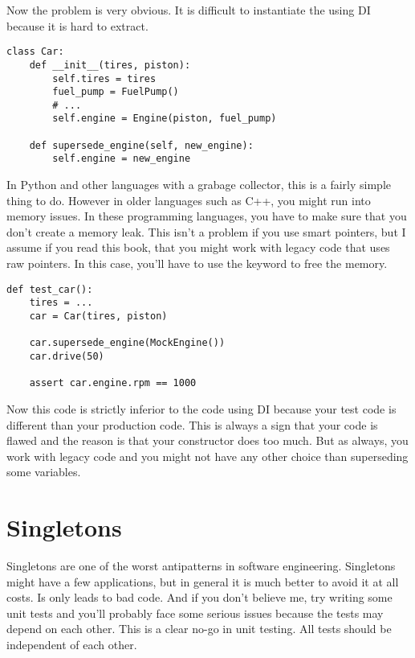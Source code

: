 Now the problem is very obvious. It is difficult to instantiate the  using DI because it is hard to extract.

\begin{programcode}{}
\begin{verbatim}
class Car:
    def __init__(tires, piston):
        self.tires = tires
        fuel_pump = FuelPump()
        # ...
        self.engine = Engine(piston, fuel_pump)

    def supersede_engine(self, new_engine):
        self.engine = new_engine
\end{verbatim}
\end{programcode}

In Python and other languages with a grabage collector, this is a fairly simple thing to do. However in older languages such as C++, you might run into memory issues. In these programming languages, you have to make sure that you don't create a memory leak. This isn't a problem if you use smart pointers, but I assume if you read this book, that you might work with legacy code that uses raw pointers. In this case, you'll have to use the  keyword to free the memory.

\begin{programcode}{}
\begin{verbatim}
def test_car():
    tires = ...
    car = Car(tires, piston)

    car.supersede_engine(MockEngine())
    car.drive(50)

    assert car.engine.rpm == 1000
\end{verbatim}
\end{programcode}

Now this code is strictly inferior to the code using DI because your test code is different than your production code. This is always a sign that your code is flawed and the reason is that your constructor does too much. But as always, you work with legacy code and you might not have any other choice than superseding some variables.

\section{Singletons}

Singletons are one of the worst antipatterns in software engineering. Singletons might have a few applications, but in general it is much better to avoid it at all costs. Is only leads to bad code. And if you don't believe me, try writing some unit tests and you'll probably face some serious issues because the tests may depend on each other. This is a clear no-go in unit testing. All tests should be independent of each other.

